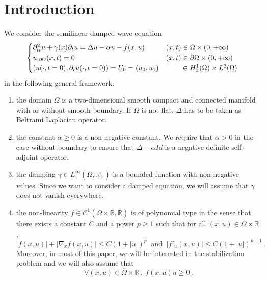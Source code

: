\documentclass[11pt]{article}
\theoremstyle{definition}
\numberwithin{equation}{section}
\numberwithin{figure}{section}
\numberwithin{table}{section}
\newcommand{\RR}{\mathbb{R}}
\newcommand{\Cc}{\mathcal{C}}
\newcommand{\grad}{\nabla}
\newcommand*{\romanenumi}{\renewcommand*{\theenumi}{\roman{enumi}}}
\let\oldforall\forall
\renewcommand*{\forall}{\mathrel{\oldforall}}
\begin{document}
\section{Introduction}

We consider the semilinear damped wave equation
\begin{equation}\label{eq}
\begin{cases}
\partial_{tt}^2 u + \gamma(x)\partial_t u = \Delta u - \alpha u - f(x,u)\:&(x,t)\in\Omega\times (0,+\infty)\\
u_{|\partial\Omega}(x,t)=0&(x,t)\in\partial\Omega\times (0,+\infty)\\
\left(u(\cdot,t=0),\partial_t u(\cdot,t=0)\right)=U_0=(u_0,u_1)& \mkern43mu\in H^1_0(\Omega)\times L^2(\Omega)
\end{cases}
\end{equation}
in the following general framework:
\begin{enumerate}\romanenumi
\item \label{listintro1.1}the domain $\Omega$ is a two-dimensional smooth compact and connected manifold with or without smooth boundary. If $\Omega$ is not flat, $\Delta$ has to be taken as Beltrami Laplacian operator.
\item \label{listintro1.2}the constant $\alpha\geq 0$ is a non-negative constant. We require that $\alpha>0$ in the case without boundary to ensure that $\Delta-\alpha Id$ is a negative definite self-adjoint operator.
\item \label{listintro1.3}the damping $\gamma\in L^\infty(\Omega,\RR_+)$ is a bounded function with non-negative values. Since we want to consider a damped equation, we will assume that $\gamma$ does not vanish everywhere.
\item \label{listintro1.4}the non-linearity $f\in\Cc^1(\overline\Omega\times\RR,\RR)$ is of polynomial type in the sense that there exists a constant $C$ and a power $p\geq 1$ such that for all $(x,u)\in \overline\Omega\times\RR$,
\begin{equation}\label{hyp-f-estim}
|f(x,u)|+|\grad_xf(x,u)|\leq C(1+|u|)^p\:\text{ and }\:|f'_u(x,u)|\leq C(1+|u|)^{p-1}\,.
\end{equation}
Moreover, in most of this paper, we will be interested in the stabilization problem and we will also assume that
\begin{equation}\label{hyp-f-sign}
\forall (x,u)\in \overline\Omega\times\RR\,,\:f(x,u)u\geq 0\,.
\end{equation}
\end{enumerate}
\end{document}
